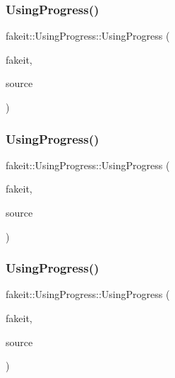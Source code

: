 \subsubsection{\texorpdfstring{UsingProgress()}{UsingProgress()}\hspace{0.1cm}{\footnotesize\ttfamily [1/9]}}
{\footnotesize\ttfamily fakeit\+::\+Using\+Progress\+::\+Using\+Progress (\begin{DoxyParamCaption}\item[{\mbox{\hyperlink{structfakeit_1_1FakeitContext}{fakeit\+::\+Fakeit\+Context}} \&}]{fakeit,  }\item[{\mbox{\hyperlink{structfakeit_1_1InvocationsSourceProxy}{Invocations\+Source\+Proxy}}}]{source }\end{DoxyParamCaption})\hspace{0.3cm}{\ttfamily [inline]}}

\mbox{\label{classfakeit_1_1UsingProgress_ac87db7ffa3ed53507cb2c98c2c0b4ee7}} 
\subsubsection{\texorpdfstring{UsingProgress()}{UsingProgress()}\hspace{0.1cm}{\footnotesize\ttfamily [2/9]}}
{\footnotesize\ttfamily fakeit\+::\+Using\+Progress\+::\+Using\+Progress (\begin{DoxyParamCaption}\item[{\mbox{\hyperlink{structfakeit_1_1FakeitContext}{fakeit\+::\+Fakeit\+Context}} \&}]{fakeit,  }\item[{\mbox{\hyperlink{structfakeit_1_1InvocationsSourceProxy}{Invocations\+Source\+Proxy}}}]{source }\end{DoxyParamCaption})\hspace{0.3cm}{\ttfamily [inline]}}

\mbox{\label{classfakeit_1_1UsingProgress_ac87db7ffa3ed53507cb2c98c2c0b4ee7}} 
\subsubsection{\texorpdfstring{UsingProgress()}{UsingProgress()}\hspace{0.1cm}{\footnotesize\ttfamily [3/9]}}
{\footnotesize\ttfamily fakeit\+::\+Using\+Progress\+::\+Using\+Progress (\begin{DoxyParamCaption}\item[{\mbox{\hyperlink{structfakeit_1_1FakeitContext}{fakeit\+::\+Fakeit\+Context}} \&}]{fakeit,  }\item[{\mbox{\hyperlink{structfakeit_1_1InvocationsSourceProxy}{Invocations\+Source\+Proxy}}}]{source }\end{DoxyParamCaption})\hspace{0.3cm}{\ttfamily [inline]}}

